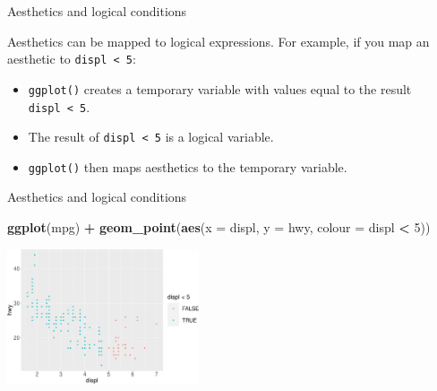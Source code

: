 \documentclass[ignorenonframetext,]{beamer}
\newenvironment{Shaded}{\begin{snugshade}}{\end{snugshade}}
\newcommand{\DataTypeTok}[1]{\textcolor[rgb]{0.13,0.29,0.53}{#1}}
\newcommand{\DecValTok}[1]{\textcolor[rgb]{0.00,0.00,0.81}{#1}}
\newcommand{\KeywordTok}[1]{\textcolor[rgb]{0.13,0.29,0.53}{\textbf{#1}}}
\newcommand{\NormalTok}[1]{#1}
\newcommand{\OperatorTok}[1]{\textcolor[rgb]{0.81,0.36,0.00}{\textbf{#1}}}
\newcommand{\StringTok}[1]{\textcolor[rgb]{0.31,0.60,0.02}{#1}}
\begin{document}
\begin{frame}[fragile]{Aesthetics and logical conditions}
\protect\hypertarget{aesthetics-and-logical-conditions}{}

Aesthetics can be mapped to logical expressions. For example, if you map
an aesthetic to \texttt{displ\ \textless{}\ 5}:

\begin{itemize}
\item
  \texttt{ggplot()} creates a temporary variable with values equal to
  the result \texttt{displ\ \textless{}\ 5}.
\item
  The result of \texttt{displ\ \textless{}\ 5} is a logical variable.
\item
  \texttt{ggplot()} then maps aesthetics to the temporary variable.
\end{itemize}

\end{frame}

\begin{frame}[fragile]{Aesthetics and logical conditions}
\protect\hypertarget{aesthetics-and-logical-conditions-1}{}

\begin{Shaded}
\begin{Highlighting}[]
\KeywordTok{ggplot}\NormalTok{(mpg) }\OperatorTok{+}\StringTok{ }
\StringTok{  }\KeywordTok{geom_point}\NormalTok{(}\KeywordTok{aes}\NormalTok{(}\DataTypeTok{x =}\NormalTok{ displ, }\DataTypeTok{y =}\NormalTok{ hwy, }
                 \DataTypeTok{colour =}\NormalTok{ displ }\OperatorTok{<}\StringTok{ }\DecValTok{5}\NormalTok{))}
\end{Highlighting}
\end{Shaded}

\begin{center}\includegraphics[height=150px]{data-visualization_files/figure-beamer/unnamed-chunk-36-1} \end{center}

\end{frame}
\end{document}
